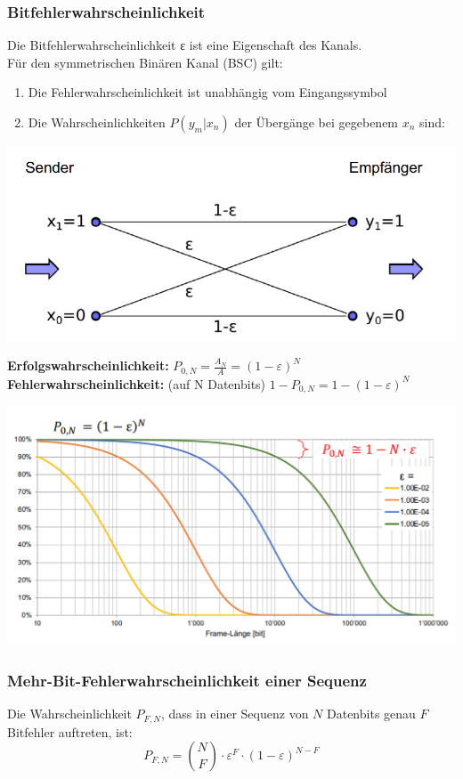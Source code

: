 \subsubsection{Bitfehlerwahrscheinlichkeit}
Die Bitfehlerwahrscheinlichkeit ε ist eine Eigenschaft des Kanals. \\
Für den symmetrischen Binären Kanal (BSC) gilt:
\begin{enumerate}
    \item Die Fehlerwahrscheinlichkeit ist unabhängig vom Eingangssymbol
    \item Die Wahrscheinlichkeiten $P(y_m|x_n)$ der Übergänge bei gegebenem $x_n$ sind:
\end{enumerate}
\begin{center}
    \includegraphics[width=1\linewidth]{images/fehlerwahrscheinlichkeiten.png}
\end{center}
\textbf{Erfolgswahrscheinlichkeit: } $P_{0,N}=\frac{A_N}{A}=(1-\varepsilon)^N$ \\
\textbf{Fehlerwahrscheinlichkeit: } (auf N Datenbits) $1-P_{0,N}=1-(1-\varepsilon)^N$
\begin{center}
    \includegraphics[width=1\linewidth]{images/fehlergraph.png}
\end{center}

\subsubsection{Mehr-Bit-Fehlerwahrscheinlichkeit einer Sequenz}%
Die Wahrscheinlichkeit $P_{F,N}$, dass in einer Sequenz von $N$ Datenbits genau $F$ Bitfehler auftreten, ist:
\[
    P_{F,N} = \binom{N}{F} \cdot \varepsilon^F \cdot (1-\varepsilon)^{N-F}
\]

